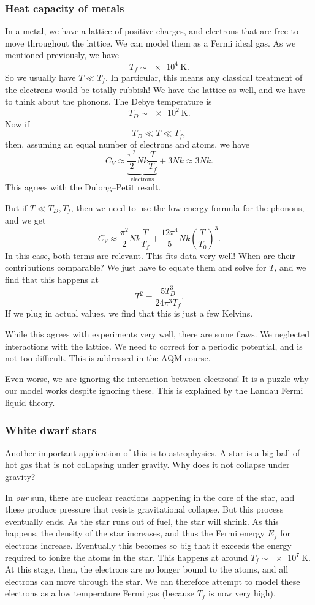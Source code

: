 \documentclass[a4paper]{article}
\begin{document}
\subsubsection*{Heat capacity of metals}
In a metal, we have a lattice of positive charges, and electrons that are free to move throughout the lattice. We can model them as a Fermi ideal gas. As we mentioned previously, we have
\[
  T_f \sim \SI{e4}{\kelvin}.
\]
So we usually have $T \ll T_f$. In particular, this means any classical treatment of the electrons would be totally rubbish! We have the lattice as well, and we have to think about the phonons. The Debye temperature is
\[
  T_D \sim \SI{e2}{\kelvin}.
\]
Now if
\[
  T_D \ll T \ll T_f,
\]
then, assuming an equal number of electrons and atoms, we have
\[
  C_V \approx \underbrace{\frac{\pi^2}{2} Nk \frac{T}{T_f}}_{\mathrm{electrons}} + 3Nk \approx 3Nk.
\]
This agrees with the Dulong--Petit result.

But if $T \ll T_D, T_f$, then we need to use the low energy formula for the phonons, and we get
\[
  C_V \approx \frac{\pi^2}{2} Nk \frac{T}{T_f} + \frac{12 \pi^4}{5} Nk \left(\frac{T}{T_0}\right)^3.
\]
In this case, both terms are relevant. This fits data very well! When are their contributions comparable? We just have to equate them and solve for $T$, and we find that this happens at
\[
  T^2 = \frac{5 T_D^3}{24 \pi^3 T_f}.
\]
If we plug in actual values, we find that this is just a few Kelvins.

While this agrees with experiments very well, there are some flaws. We neglected interactions with the lattice. We need to correct for a periodic potential, and is not too difficult. This is addressed in the AQM course.

Even worse, we are ignoring the interaction between electrons! It is a puzzle why our model works despite ignoring these. This is explained by the Landau Fermi liquid theory.

\subsubsection*{White dwarf stars}
Another important application of this is to astrophysics. A star is a big ball of hot gas that is not collapsing under gravity. Why does it not collapse under gravity?

In \emph{our} sun, there are nuclear reactions happening in the core of the star, and these produce pressure that resists gravitational collapse. But this process eventually ends. As the star runs out of fuel, the star will shrink. As this happens, the density of the star increases, and thus the Fermi energy $E_f$ for electrons increase. Eventually this becomes so big that it exceeds the energy required to ionize the atoms in the star. This happens at around $T_f \sim \SI{e7}{\kelvin}$. At this stage, then, the electrons are no longer bound to the atoms, and all electrons can move through the star. We can therefore attempt to model these electrons as a low temperature Fermi gas (because $T_f$ is now very high).
\end{document}
